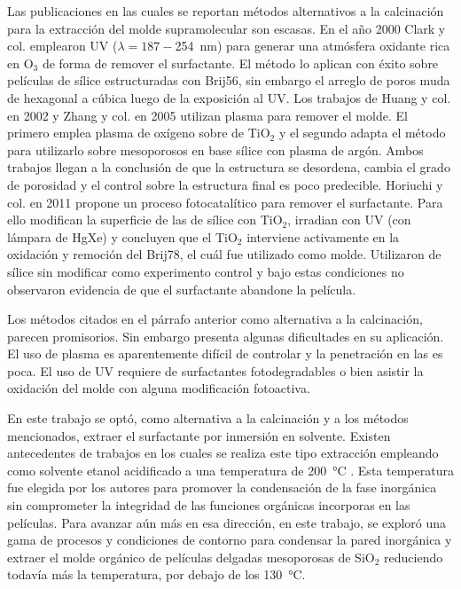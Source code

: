 	Las publicaciones en las cuales se reportan métodos alternativos a la calcinación para la extracción del molde supramolecular son escasas. En el año 2000 Clark y col.\cite{Clark2000} emplearon UV ($\lambda=187-$\SI{254}{\nm}) para generar una atmósfera oxidante rica en O$_3$ de forma de remover el surfactante. El método lo aplican con éxito sobre películas de sílice estructuradas con Brij56, sin embargo el arreglo de poros muda de hexagonal a cúbica luego de la exposición al UV. Los trabajos de Huang y col. en 2002\cite{Huang2002} y Zhang y col. en 2005\cite{Zhang2005} utilizan plasma para remover el molde. El primero emplea plasma de oxígeno sobre \pdm\space de TiO$_2$ y el segundo adapta el método para utilizarlo sobre mesoporosos en base sílice con plasma de argón. Ambos trabajos llegan a la conclusión de que la estructura se desordena, cambia el grado de porosidad y el control sobre la estructura final es poco predecible. Horiuchi y col.\cite{Horiuchi2011} en 2011 propone un proceso fotocatalítico para remover el surfactante. Para ello modifican la superficie de las \pdm\space de sílice con TiO$_2$, irradian con UV (con lámpara de HgXe) y concluyen que el TiO$_2$ interviene activamente en la oxidación y remoción del Brij78, el cuál fue utilizado como molde. Utilizaron \pdm\space de sílice sin modificar como experimento control y bajo estas condiciones no observaron evidencia de que el surfactante abandone la película.

	Los métodos citados en el párrafo anterior como alternativa a la calcinación, parecen promisorios. Sin embargo presenta algunas dificultades en su aplicación. El uso de plasma es aparentemente difícil de controlar y la penetración en las \pdm\space es poca. El uso de UV requiere de surfactantes fotodegradables o bien asistir la oxidación del molde con alguna modificación fotoactiva.

	En este trabajo se optó, como alternativa a la calcinación y a los métodos mencionados, extraer el surfactante por inmersión en solvente. Existen antecedentes de trabajos en los cuales se realiza este tipo extracción empleando como solvente etanol acidificado a una temperatura de \SI{200}{\celsius} \cite{Angelome2008,Calvo20210,Calvo2010,Fuertes2009}. Esta temperatura fue elegida por los autores para promover la condensación de la fase inorgánica sin comprometer la integridad de las funciones orgánicas incorporas en las películas. Para avanzar aún más en esa dirección, en este trabajo, se exploró una gama de procesos y condiciones de contorno para condensar la pared inorgánica y extraer el molde orgánico de películas delgadas mesoporosas de SiO$_2$ reduciendo todavía más la temperatura, por debajo de los \SI{130}{\celsius}.

